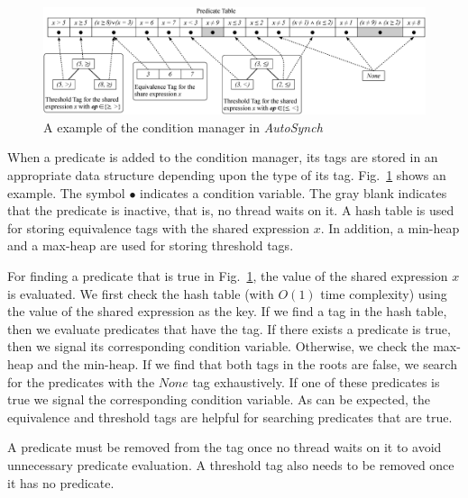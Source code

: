 \documentclass{sigplanconf}
\newtheorem{definition}{Definition}
\begin{document}
\begin{figure}[ht!]
  \centering
  \includegraphics[width=180mm]{fig/manager.eps}
  \caption{A example of the condition manager in {\em AutoSynch}}
  \label{fig:mgr}
\end{figure}


When a predicate is added to the condition manager, 
its tags are stored in an appropriate data structure depending upon the type of its tag.
Fig.~\ref{fig:mgr} shows an example. The symbol $\bullet$ indicates 
a condition variable. The gray blank indicates that the predicate is inactive,
that is, no thread waits on it. A hash table is used for
storing equivalence tags with the shared expression $x$. In addition, 
a min-heap and a max-heap are used for storing threshold tags. 



For finding a predicate that is true in Fig.~\ref{fig:mgr}, the value of the
shared expression $x$ is evaluated. We first check the hash table 
(with $O(1)$ time complexity) using the value of the shared expression as the
key. If we find a tag in the hash table, then we evaluate predicates that have
the tag. If there exists a predicate is true, then we signal its corresponding 
condition 
variable. Otherwise, we check the max-heap and the min-heap. If we find that 
both tags in the roots are false, we search for the predicates with the $None$ 
tag exhaustively. If one of these predicates is true
we signal the corresponding condition variable. As can
be expected, the equivalence and threshold tags are helpful for searching 
predicates that are true.   

A predicate must be removed from the tag once no thread waits on 
it to avoid unnecessary predicate evaluation. A threshold tag also needs to be
removed once it has no predicate. 
\end{document}
